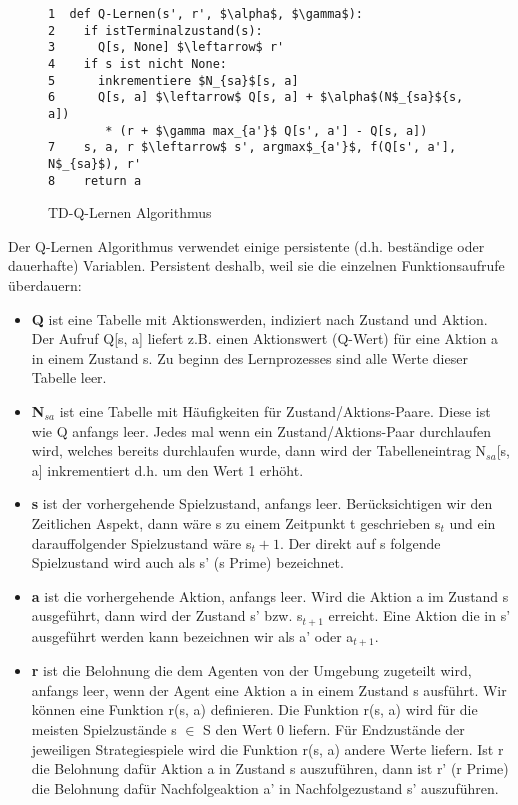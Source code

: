 \begin{figure}[!htbp]
\centering
\begin{lstlisting}[frame=single, mathescape=true]
1  def Q-Lernen(s', r', $\alpha$, $\gamma$):
2    if istTerminalzustand(s):
3      Q[s, None] $\leftarrow$ r'
4    if s ist nicht None:
5      inkrementiere $N_{sa}$[s, a]
6      Q[s, a] $\leftarrow$ Q[s, a] + $\alpha$(N$_{sa}${s, a])
  		* (r + $\gamma max_{a'}$ Q[s', a'] - Q[s, a])
7    s, a, r $\leftarrow$ s', argmax$_{a'}$, f(Q[s', a'], N$_{sa}$), r'
8    return a
\end{lstlisting}
\caption{TD-Q-Lernen Algorithmus}
\label{fig:TD-Q-Lernen Algorithmus}
\end{figure} 

Der Q-Lernen Algorithmus verwendet einige persistente (d.h. beständige oder dauerhafte) Variablen. Persistent deshalb, weil sie die einzelnen Funktionsaufrufe überdauern: 
\begin{itemize}

\item \textbf{Q} ist eine Tabelle mit Aktionswerden, indiziert nach Zustand und Aktion. Der Aufruf Q[s, a] liefert z.B. einen Aktionswert (Q-Wert) für eine Aktion a in einem Zustand s. Zu beginn des Lernprozesses sind alle Werte dieser Tabelle leer.

\item \textbf{N$_{sa}$} ist eine Tabelle mit Häufigkeiten für Zustand/Aktions-Paare.  Diese ist wie Q anfangs leer. Jedes mal wenn ein Zustand/Aktions-Paar durchlaufen wird, welches bereits durchlaufen wurde, dann wird der Tabelleneintrag N$_{sa}$[s, a] inkrementiert d.h. um den Wert 1 erhöht.

\item \textbf{s} ist der vorhergehende Spielzustand, anfangs leer. Berücksichtigen wir den Zeitlichen Aspekt, dann wäre s zu einem Zeitpunkt t geschrieben s${_t}$ und ein darauffolgender Spielzustand wäre s${_t+1}$. Der direkt auf s folgende Spielzustand wird auch als s' (s Prime) bezeichnet.

\item \textbf{a} ist die vorhergehende Aktion, anfangs leer. Wird die Aktion a im Zustand s ausgeführt, dann wird der Zustand s' bzw. s$_{t+1}$ erreicht. Eine Aktion die in s' ausgeführt werden kann bezeichnen wir als a' oder a$_{t+1}$.

\item \textbf{r} ist die Belohnung die dem Agenten von der Umgebung zugeteilt wird, anfangs leer, wenn der Agent eine Aktion a in einem Zustand s ausführt. Wir können eine Funktion r(s, a) definieren. Die Funktion r(s, a) wird für die meisten Spielzustände s $\in$ S den Wert 0 liefern. Für Endzustände der jeweiligen Strategiespiele wird die Funktion r(s, a) andere Werte liefern. Ist r die Belohnung dafür Aktion a in Zustand s auszuführen, dann ist r' (r Prime) die Belohnung dafür Nachfolgeaktion a' in Nachfolgezustand s' auszuführen.
\end{itemize}

